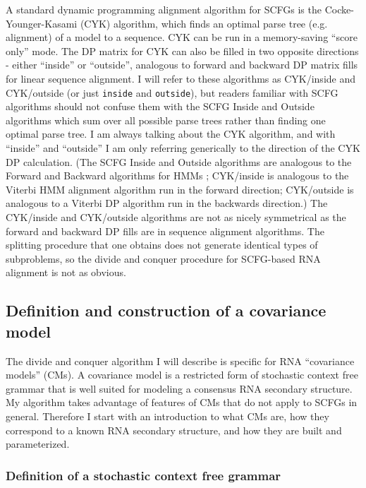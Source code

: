 \documentclass[11pt]{article}
\begin{document}
A standard dynamic programming alignment algorithm for SCFGs is the
Cocke-Younger-Kasami (CYK) algorithm, which finds an optimal parse
tree (e.g. alignment) of a model to a sequence. CYK can be run in a
memory-saving ``score only'' mode. The DP matrix for CYK can also be
filled in two opposite directions - either ``inside'' or ``outside'',
analogous to forward and backward DP matrix fills for linear sequence
alignment.  I will refer to these algorithms as CYK/inside and
CYK/outside (or just \texttt{inside} and \texttt{outside}), but
readers familiar with SCFG algorithms should not confuse them with the
SCFG Inside and Outside algorithms \cite{Lari90,Lari91} which sum over
all possible parse trees rather than finding one optimal parse tree. I
am always talking about the CYK algorithm, and with ``inside'' and
``outside'' I am only referring generically to the direction of the
CYK DP calculation. (The SCFG Inside and Outside algorithms are
analogous to the Forward and Backward algorithms for HMMs
\cite{Rabiner89,Durbin98}; CYK/inside is analogous to the Viterbi HMM
alignment algorithm run in the forward direction; CYK/outside is
analogous to a Viterbi DP algorithm run in the backwards direction.)
The CYK/inside and CYK/outside algorithms are not as nicely
symmetrical as the forward and backward DP fills are in sequence
alignment algorithms. The splitting procedure that one obtains does
not generate identical types of subproblems, so the divide and conquer
procedure for SCFG-based RNA alignment is not as obvious.

\subsection{Definition and construction of a covariance model}

The divide and conquer algorithm I will describe is specific for RNA
``covariance models'' (CMs). A covariance model is a restricted form
of stochastic context free grammar that is well suited for modeling a
consensus RNA secondary structure\cite{Eddy94,Durbin98}. My algorithm
takes advantage of features of CMs that do not apply to SCFGs in
general.  Therefore I start with an introduction to what CMs are, how
they correspond to a known RNA secondary structure, and how they are
built and parameterized.

\subsubsection{Definition of a stochastic context free grammar}
\end{document}
